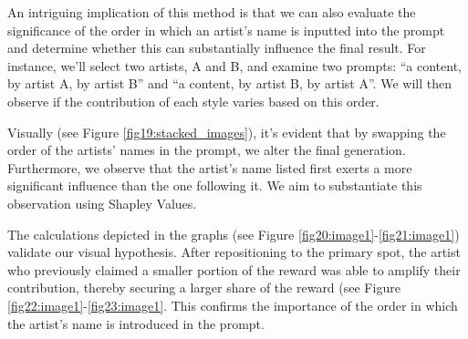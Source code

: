 \documentclass[12pt, letterpaper]{article}
\begin{document}
An intriguing implication of this method is that we can also evaluate the significance of the order in which an artist's name is inputted into the prompt and determine whether this can substantially influence the final result. For instance, we'll select two artists, A and B, and examine two prompts: “a content, by artist A, by artist B” and “a content, by artist B, by artist A”. We will then observe if the contribution of each style varies based on this order.

Visually (see Figure \ref{fig19:stacked_images}), it's evident that by swapping the order of the artists' names in the prompt, we alter the final generation. Furthermore, we observe that the artist's name listed first exerts a more significant influence than the one following it. We aim to substantiate this observation using Shapley Values.

The calculations depicted in the graphs (see Figure \ref{fig20:image1}-\ref{fig21:image1}) validate our visual hypothesis. After repositioning to the primary spot, the artist who previously claimed a smaller portion of the reward was able to amplify their contribution, thereby securing a larger share of the reward (see Figure \ref{fig22:image1}-\ref{fig23:image1}. This confirms the importance of the order in which the artist's name is introduced in the prompt.
\end{document}
